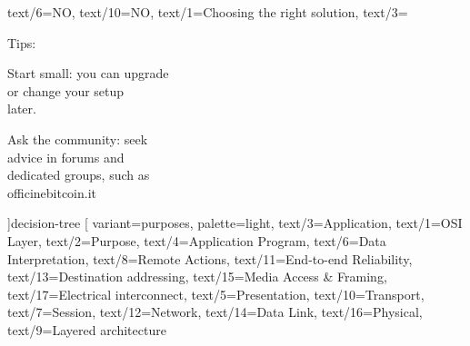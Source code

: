 \documentclass[aspectratio=169]{beamer}
\begin{document}
  text/6={NO},
  text/10={NO},
  text/1={Choosing the right solution},
  text/3={Tips:\par Start small: you can upgrade\\or change your setup\\later.\par Ask the community: seek\\advice in forums and\\dedicated groups, such as\\officinebitcoin.it}
]{decision-tree}
\gdef\studiocataloguename{\detokenize{system-architecture}}
\gdef\studiocataloguename{\detokenize{radial-goals}}
\gdef\studiocataloguename{\detokenize{nested-circles}}
\gdef\studiocataloguename{\detokenize{separate-circles}}
\gdef\studiocataloguename{\detokenize{triangle-tradeoff}}
\gdef\studiocataloguename{\detokenize{layered-stack}}
\studiotemplate[
  variant={purposes},
  palette={light},
  text/3={Application},
  text/1={OSI Layer},
  text/2={Purpose},
  text/4={Application Program},
  text/6={Data Interpretation},
  text/8={Remote Actions},
  text/11={End-to-end Reliability},
  text/13={Destination addressing},
  text/15={Media Access \& Framing},
  text/17={Electrical interconnect},
  text/5={Presentation},
  text/10={Transport},
  text/7={Session},
  text/12={Network},
  text/14={Data Link},
  text/16={Physical},
  text/9={Layered architecture}
\end{document}
